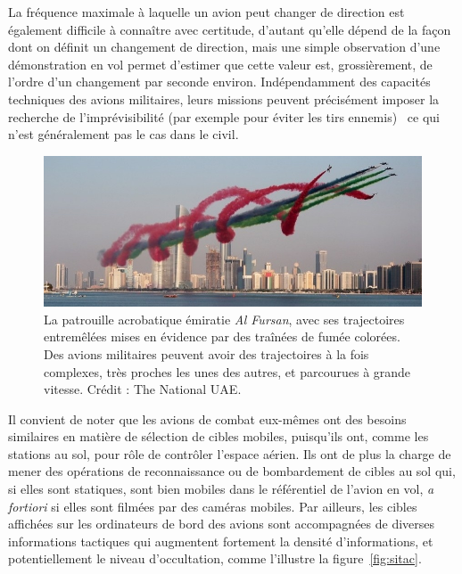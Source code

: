 	\addtocounter{footnote}{-2}
	\addtocounter{footnote}{1}
	\addtocounter{footnote}{1}
	
	La fréquence maximale à laquelle un avion peut changer de direction est également difficile à connaître avec certitude, d'autant qu'elle dépend de la façon dont on définit un changement de direction, mais une simple observation d'une démonstration en vol permet d'estimer que cette valeur est, grossièrement, de l'ordre d'un changement par seconde environ\footnotemark. Indépendamment des capacités techniques des avions militaires, leurs missions peuvent précisément imposer la recherche de l'imprévisibilité (par exemple pour éviter les tirs ennemis)~\cite{shaw1985fighter} ce qui n'est généralement pas le cas dans le civil.
	
	
	\begin{figure}[!htbp]
		\centering
		\includegraphics[width=\textwidth]{figures/ch1/AlFursan}
		\caption[La patrouille acrobatique \emph{Al Fursan}]{La patrouille acrobatique émiratie \emph{Al Fursan}, avec ses trajectoires entremêlées mises en évidence par des traînées de fumée colorées. Des avions militaires peuvent avoir des trajectoires à la fois complexes, très proches les unes des autres, et parcourues à grande vitesse. Crédit : The National UAE.}
		\label{fig:alfursan}
	\end{figure}
	
	Il convient de noter que les avions de combat eux-mêmes ont des besoins similaires en matière de sélection de cibles mobiles, puisqu'ils ont, comme les stations au sol, pour rôle de contrôler l'espace aérien. Ils ont de plus la charge de mener des opérations de reconnaissance ou de bombardement de cibles au sol qui, si elles sont statiques, sont bien mobiles dans le référentiel de l'avion en vol, \emph{a fortiori} si elles sont filmées par des caméras mobiles. Par ailleurs, les cibles affichées sur les ordinateurs de bord des avions sont accompagnées de diverses informations tactiques qui augmentent fortement la densité d'informations, et potentiellement le niveau d'occultation, comme l'illustre la figure~\ref{fig:sitac}.
	
